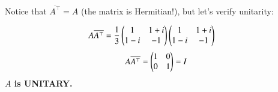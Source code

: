 \documentclass[journal]{IEEEtran}
\begin{document}
Notice that $\overline{A^\top} = A$ (the matrix is Hermitian!), but let's verify unitarity:

\begin{align}
	A\overline{A^\top} &= \frac{1}{3}\begin{pmatrix}1 & 1+i \\ 1-i & -1\end{pmatrix}\begin{pmatrix}1 & 1+i \\ 1-i & -1\end{pmatrix}
\end{align}
\begin{equation}
	A\overline{A^\top} = \begin{pmatrix}1 & 0 \\ 0 & 1\end{pmatrix} = I
\end{equation}
\textbf{$A$ is UNITARY.}\\
	
	
	
	
	
\end{document}
